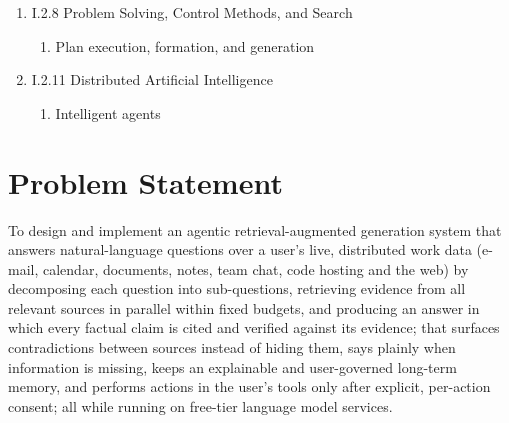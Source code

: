 \documentclass[oneside,a4paper,12pt]{report}
\begin{document}
\begin{enumerate}
\begin{enumerate}
\begin{enumerate}
\begin{enumerate}
			\end{enumerate}
			\item I.2.8 Problem Solving, Control Methods, and Search
			\begin{enumerate}
				\item Plan execution, formation, and generation
			\end{enumerate}
			\item I.2.11 Distributed Artificial Intelligence
			\begin{enumerate}
				\item Intelligent agents
			\end{enumerate}
		\end{enumerate}
	\end{enumerate}
\end{enumerate}



\section{Problem Statement}
\label{sec:problem}
To design and implement an agentic retrieval-augmented generation system that answers natural-language questions over a user's live, distributed work data (e-mail, calendar, documents, notes, team chat, code hosting and the web) by decomposing each question into sub-questions, retrieving evidence from all relevant sources in parallel within fixed budgets, and producing an answer in which every factual claim is cited and verified against its evidence; that surfaces contradictions between sources instead of hiding them, says plainly when information is missing, keeps an explainable and user-governed long-term memory, and performs actions in the user's tools only after explicit, per-action consent; all while running on free-tier language model services.
\end{document}

